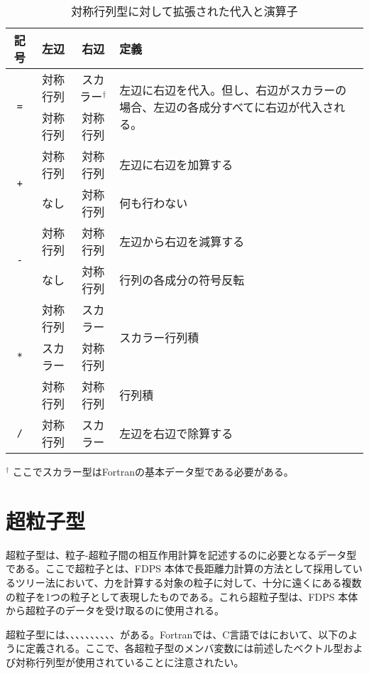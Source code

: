 \begin{table}[H]
\begin{tabularx}{\linewidth}{|c|c|c|X|}
\toprule
\rowcolor{Snow2}
記号 & 左辺 & 右辺 & 定義 \\
\midrule
\multirow{2}{*}{\texttt{=}}& 対称行列 & スカラー$^{\dagger}$ & \multirow{2}{\hsize}{\footnotesize 左辺に右辺を代入。但し、右辺がスカラーの場合、左辺の各成分すべてに右辺が代入される。} \\
\cmidrule(r){2-3}
& 対称行列 & 対称行列 & \\
\midrule
\multirow{2}{*}{\texttt{+}} & 対称行列 & 対称行列 & 左辺に右辺を加算する\\
\cmidrule(r){2-4}
& なし & 対称行列 & 何も行わない\\
\midrule
\multirow{2}{*}{\texttt{-}} & 対称行列 & 対称行列 & 左辺から右辺を減算する\\
\cmidrule(r){2-4}
& なし & 対称行列 & 行列の各成分の符号反転\\
\midrule
\multirow{3}{*}{\texttt{*}} & 対称行列 & スカラー & \multirow{2}{*}{スカラー行列積} \\
\cmidrule(r){2-3}
 & スカラー & 対称行列 &  \\
\cmidrule(r){2-4}
 & 対称行列 & 対称行列 & 行列積 \\
\midrule
\texttt{/} & 対称行列 & スカラー & 左辺を右辺で除算する \\
\bottomrule
\end{tabularx}
\begin{flushleft}
$^{\dagger}$ ここでスカラー型はFortranの基本データ型である必要がある。
\end{flushleft}
\caption{対称行列型に対して拡張された代入と演算子}
\label{tbl:op_ext:fdps_matrix}
\end{table}


\section{超粒子型}
\label{sec:super_particle_types}
超粒子型は、粒子-超粒子間の相互作用計算を記述するのに必要となるデータ型である。ここで超粒子とは、FDPS 本体で長距離力計算の方法として採用しているツリー法において、力を計算する対象の粒子に対して、十分に遠くにある複数の粒子を1つの粒子として表現したものである。これら超粒子型は、FDPS 本体から超粒子のデータを受け取るのに使用される。

超粒子型には、、、、、、、、、、がある。Fortranでは、C言語ではにおいて、以下のように定義される。ここで、各超粒子型のメンバ変数には前述したベクトル型および対称行列型が使用されていることに注意されたい。

